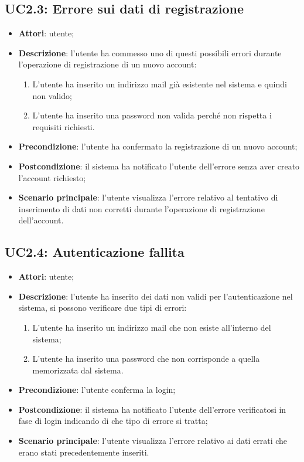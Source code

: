 \subsection{UC2.3: Errore sui dati di registrazione}
\label{UC2.3}
\begin{itemize}
\item \textbf{Attori}: utente;
\item \textbf{Descrizione}: l'utente ha commesso uno di questi possibili errori durante l'operazione di registrazione di un nuovo account:
\begin{enumerate}
\item L'utente ha inserito un indirizzo mail già esistente nel sistema e quindi non valido;
\item L'utente ha inserito una password non valida perché non rispetta i requisiti richiesti.
\end{enumerate}
\item \textbf{Precondizione}: l'utente ha confermato la registrazione di un nuovo account;
\item \textbf{Postcondizione}: il sistema ha notificato l'utente dell'errore senza aver creato l'account richiesto;
\item \textbf{Scenario principale}:
l'utente visualizza l'errore relativo al tentativo di inserimento di dati non corretti durante l'operazione di registrazione dell’account.
\end{itemize}
\subsection{UC2.4: Autenticazione fallita}
\label{UC2.4}
\begin{itemize}
\item \textbf{Attori}: utente;
\item \textbf{Descrizione}: l'utente ha inserito dei dati non validi per l'autenticazione nel sistema, si possono verificare due tipi di errori:
\begin{enumerate}
\item L'utente ha inserito un indirizzo mail che non esiste all’interno del sistema;
\item L'utente ha inserito una password che non corrisponde a quella memorizzata dal sistema.
\end{enumerate}
\item \textbf{Precondizione}: l'utente conferma la login;
\item \textbf{Postcondizione}: il sistema ha notificato l'utente dell'errore verificatosi in fase di login indicando di che tipo di errore si tratta;
\item \textbf{Scenario principale}:
l'utente visualizza l'errore relativo ai dati errati che erano stati precedentemente inseriti.
\end{itemize}
